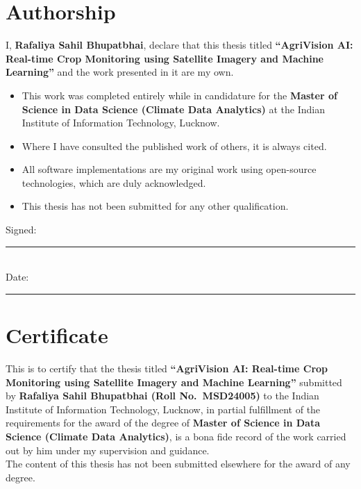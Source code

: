 \documentclass[12pt,a4paper,oneside]{report}
\begin{document}
\chapter*{Authorship}
I, \textbf{Rafaliya Sahil Bhupatbhai}, declare that this thesis titled
\textbf{``AgriVision AI: Real-time Crop Monitoring using Satellite Imagery
and Machine Learning''} and the work presented in it are my own.

\begin{itemize}
  \item This work was completed entirely while in candidature for the
        \textbf{Master of Science in Data Science (Climate Data Analytics)}
        at the Indian Institute of Information Technology, Lucknow.
  \item Where I have consulted the published work of others, it is always cited.
  \item All software implementations are my original work using open-source
        technologies, which are duly acknowledged.
  \item This thesis has not been submitted for any other qualification.
\end{itemize}

\vspace{1.2cm}
\noindent Signed: \rule{6cm}{0.5pt}\\[1cm]
\noindent Date: \rule{4cm}{0.5pt}
\newpage

\chapter*{Certificate}
This is to certify that the thesis titled \textbf{``AgriVision AI: Real-time Crop
Monitoring using Satellite Imagery and Machine Learning''} submitted by
\textbf{Rafaliya Sahil Bhupatbhai (Roll No.~MSD24005)} to the Indian Institute of
Information Technology, Lucknow, in partial fulfillment of the requirements for the
award of the degree of \textbf{Master of Science in Data Science (Climate Data
Analytics)}, is a bona fide record of the work carried out by him under my
supervision and guidance.\\[0.8cm]
The content of this thesis has not been submitted elsewhere for the award of any degree.
\vspace{3cm}
\end{document}
